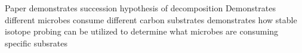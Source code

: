 Paper demonstrates succession hypothesis of decomposition
Demonstrates different microbes consume different carbon substrates
demonstrates how stable isotope probing can be utilized to determine what microbes are consuming specific subsrates